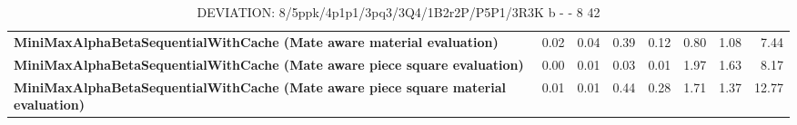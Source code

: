 \begin{table}[H]
{\begin{tabular}{|p{8cm}|*{7}{r|}}
            \rowcolor[HTML]{EFEFEF}
            \textbf{MiniMaxAlphaBetaSequentialWithCache (Mate aware material evaluation)}              & 0.02 & 0.04 & 0.39 & 0.12 & 0.80 & 1.08 & 7.44 \\
            \rowcolor[HTML]{FFFFFF}
            \textbf{MiniMaxAlphaBetaSequentialWithCache (Mate aware piece square evaluation)}               & 0.00 & 0.01 & 0.03 & 0.01 & 1.97 & 1.63 & 8.17 \\
            \rowcolor[HTML]{EFEFEF}
            \textbf{MiniMaxAlphaBetaSequentialWithCache (Mate aware piece square material evaluation)}               & 0.01 & 0.01 & 0.44 & 0.28 & 1.71 & 1.37 & 12.77 \\

            \hline
        \end{tabular}%
    }
    \caption{DEVIATION: 8/5ppk/4p1p1/3pq3/3Q4/1B2r2P/P5P1/3R3K b - - 8 42}
    \label{tab:end-game---deflection---short-deviation}
\end{table}
